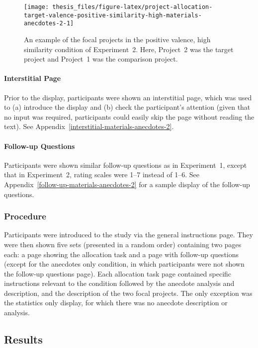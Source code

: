 \documentclass[a4paper, nobind]{templates/ociamthesis}
\theoremstyle{definition}
\theoremstyle{definition}
\theoremstyle{definition}
\theoremstyle{definition}
\theoremstyle{remark}
\begin{document}
\begin{figure}
\texttt{[image: thesis\_files/figure-latex/project-allocation-target-valence-positive-similarity-high-materials-anecdotes-2-1]} \caption{An example of the focal projects in the positive valence, high similarity condition of Experiment~2. Here, Project~2 was the target project and Project~1 was the comparison project.}\label{fig:project-allocation-target-valence-positive-similarity-high-materials-anecdotes-2}
\end{figure}

\paragraph{Interstitial Page}

Prior to the display, participants were shown an interstitial page, which was
used to (a) introduce the display and (b) check the participant's attention
(given that no input was required, participants could easily skip the page
without reading the text). See
Appendix~\ref{interstitial-materials-anecdotes-2}.

\paragraph{Follow-up Questions}

Participants were shown similar follow-up questions as in Experiment~1, except
that in Experiment~2, rating scales were 1--7 instead of 1--6. See
Appendix~\ref{follow-up-materials-anecdotes-2} for a sample display of the
follow-up questions.

\subsubsection{Procedure}

Participants were introduced to the study via the general instructions page.
They were then shown five sets (presented in a random order) containing two
pages each: a page showing the allocation task and a page with follow-up
questions (except for the anecdotes only condition, in which participants were
not shown the follow-up questions page). Each allocation task page contained
specific instructions relevant to the condition followed by the anecdote
analysis and description, and the description of the two focal projects. The only
exception was the statistics only display, for which there was no anecdote
description or analysis.

\subsection{Results}
\end{document}
